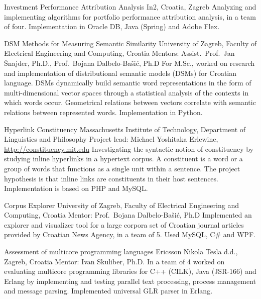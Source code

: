 \documentclass[11pt,a4paper]{moderncv}
\begin{document}
	{Investment Performance Attribution Analysis}
	{\newline{}In2, Croatia, Zagreb}
	{}
	{}
	{Analyzing and implementing algorithms for portfolio performance attribution analysis, in a team of four. Implementation in Oracle DB, Java (Spring) and Adobe Flex.}

	{DSM Methods for Measuring Semantic Similarity}
	{\newline{}University of Zagreb, Faculty of Electrical Engineering and Computing, Croatia}
	{}
	{\newline{}Mentors: Assist.~Prof.~Jan \v{S}najder, Ph.D., Prof.~Bojana Dalbelo-Ba\v{s}i\'{c}, Ph.D}
	{For M.Sc., worked on research and implementation of distributional semantic models (DSMs) for Croatian language. DSMs dynamically build semantic word representations in the form of multi-dimensional vector spaces through a statistical analysis of the contexts in which words occur. Geometrical relations between vectors correlate with semantic relations between represented words. Implementation in Python.}

	{Hyperlink Constituency}
	{\newline{}Massachusetts Institute of Technology, Department of Linguistics and Philosophy}
	{\newline{}Project lead: Michael Yoshitaka Erlewine, \url{http://constituency.mit.edu}}
	{}
	{Investigating the syntactic notion of constituency by studying inline hyperlinks in a hypertext corpus. A constituent is a word or a group of words that functions as a single unit within a sentence. The project hypothesis is that inline links are constituents in their host sentences. Implementation is based on PHP and MySQL.}
 
	{Corpus Explorer}
	{\newline{}University of Zagreb, Faculty of Electrical Engineering and Computing, Croatia}
	{}
	{\newline{}Mentor: Prof.~Bojana Dalbelo-Ba\v{s}i\'{c}, Ph.D}
	{Implemented an explorer and visualizer tool for a large corpora set of Croatian journal articles provided by Croatian News Agency, in a team of 5. Used MySQL, C\# and WPF.}

	{Assessment of multicore programming languages}
	{\newline{}Ericsson Nikola Tesla d.d., Zagreb, Croatia}
	{}
	{\newline{}Mentor: Ivan Skuliber, Ph.D.}
	{In a team of 4 worked on evaluating multicore programming libraries for C++ (CILK), Java (JSR-166) and Erlang by implementing and testing parallel text processing, process management and message parsing. Implemented universal GLR parser in Erlang.}
\end{document}
